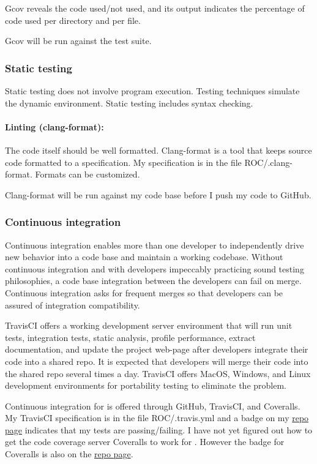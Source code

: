 \documentclass[12pt, titlepage]{article}
\begin{document}
Gcov reveals the code used/not used, and its output indicates the percentage of code used
per directory and per file.

Gcov will be run against the test suite.

\subsubsection{Static testing}
Static testing does not involve program execution.
Testing techniques simulate the dynamic environment.
Static testing includes syntax checking.

\paragraph{Linting (clang-format):}
The code itself should be well formatted. Clang-format is a tool that keeps source code formatted
to a specification. My specification is in the file ROC/.clang-format. Formats can be customized.

Clang-format will be run against my code base before I push my code to GitHub. 

\subsubsection{Continuous integration}
Continuous integration enables more than one developer to independently drive new behavior into
a code base and maintain a working codebase. Without continuous integration and with developers
impeccably practicing sound testing philosophies, a code base integration between the developers
can fail on merge. Continuous integration asks for frequent merges so that developers can be
assured of integration compatibility.

TravisCI offers a working development server environment that will run unit tests, integration tests,
static analysis, profile performance, extract documentation, and update the project web-page
after developers integrate their code into a shared repo. It is expected that developers
will merge their code into the shared repo several times a day.
TravisCI offers MacOS, Windows, and Linux development environments for portability testing
to eliminate the  problem.

Continuous integration for  is offered through GitHub, TravisCI, and Coveralls.
My TravisCI specification is in the file ROC/.travis.yml and a badge on my 
\href{https://github.com/JohnErnsthausen/roc}{repo page} indicates that my tests are passing/failing.
I have not yet figured out how to get the code coverage server Coveralls to work for . However
the badge for Coveralls is also on the  \href{https://github.com/JohnErnsthausen/roc}{repo page}.
\end{document}
